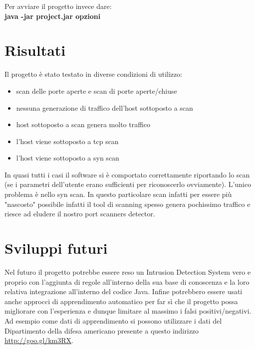 \documentclass[a4paper,12pt]{article} %
\begin{document}
Per avviare il progetto invece dare:\\

\textbf{java -jar project.jar opzioni}





\section{Risultati}

Il progetto è stato testato in diverse condizioni di utilizzo:

\begin{itemize}
\item scan delle porte aperte e scan di porte aperte/chiuse
\item nessuna generazione di traffico dell'host sottoposto a scan
\item host sottoposto a scan genera molto traffico
\item l'host viene sottoposto a tcp scan  
\item l'host viene sottoposto a syn scan 

\end{itemize}



In quasi tutti i casi il software si è comportato correttamente riportando lo scan (se i parametri dell'utente erano sufficienti
per riconoscerlo ovviamente). L'unico problema è nello syn scan. In questo particolare scan infatti per essere più "nascosto"
possibile infatti il tool di scanning spesso genera pochissimo traffico e riesce ad eludere il nostro port scanners detector.









\section{Sviluppi futuri}


Nel futuro il progetto potrebbe essere reso un Intrusion Detection System vero e proprio con l'aggiunta
di regole all'interno della sua base di conoscenza e la loro relativa integrazione all'interno del codice
Java. Infine potrebbero essere usati anche approcci di apprendimento automatico per far sì che il progetto
possa migliorare con l'esperienza e dunque limitare al massimo i falsi positivi/negativi. Ad esempio
come dati di apprendimento si possono utilizzare i dati del Dipartimento della difesa americano presente 
a questo indirizzo \href{http://goo.gl/km3RX}{http://goo.gl/km3RX}. 
\end{document}
